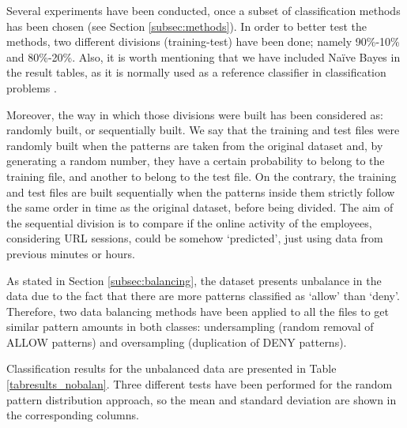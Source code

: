 \documentclass{llncs}
\begin{document}
\noindent Several experiments have been conducted, once a subset of classification methods has been chosen (see Section \ref{subsec:methods}). In order to better test the methods, two different divisions (training-test) have been done; namely 90\%-10\% and 80\%-20\%. Also, it is worth mentioning that we have included Na\"ive Bayes in the result tables, as it is normally used as a reference classifier in classification problems \cite{Frank2011}.   

Moreover, the way in which those divisions were built has been considered as: randomly built, or sequentially built. We say that the training and test files were randomly built when the patterns are taken from the original dataset and, by generating a random number, they have a certain probability to belong to the training file, and another to belong to the test file. On the contrary, the training and test files are built sequentially when the patterns inside them strictly follow the same order in time as the original dataset, before being divided. The aim of the sequential division is to compare if the online activity of the employees, considering URL sessions, could be somehow `predicted', just using data from previous minutes or hours.

As stated in Section \ref{subsec:balancing}, the dataset presents unbalance in the data due to the fact that there are more patterns classified as `allow' than `deny'. Therefore, two data balancing methods have been applied to all the files to get similar pattern amounts in both classes: undersampling (random removal of ALLOW patterns) and oversampling (duplication of DENY patterns). 

Classification results for the unbalanced data are presented in Table \ref{tabresults_nobalan}. Three different tests have been performed for the random pattern distribution approach, so the mean and standard deviation are shown in the corresponding columns.
\end{document}
